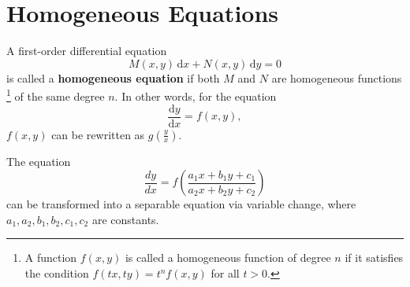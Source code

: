 \documentclass[11pt]{elegantbook}
\begin{document}
\section{Homogeneous Equations}
\begin{definition}\label{def:homogeneous equations}
    A first-order differential equation 
    \begin{equation*}
        M(x, y) \, \mathrm{d}x + N(x, y) \, \mathrm{d}y = 0
    \end{equation*}
    is called a \textbf{homogeneous equation} if both \(M\) and \(N\) are homogeneous functions
    \footnote{
        A function \(f(x, y)\) is called a homogeneous function of degree \(n\) 
        if it satisfies the condition \(f(tx, ty) = t^n f(x, y)\) for all \(t > 0\).
        }
    of the same degree \(n\).    
    In other words, for the equation
    \[
        \frac{\mathrm{d}y}{\mathrm{d}x} = f(x, y), 
    \]
    \(f(x,y)\) can be rewritten as \(g\left(\frac{y}{x}\right)\).
\end{definition}


The equation  
\begin{equation}\label{eq:Second kind separable equation}
    \frac{dy}{dx} = f\left(\frac{a_1x + b_1y + c_1}{a_2x + b_2y + c_2}\right) 
\end{equation}
can be transformed into a separable equation via variable change, 
where \(a_1, a_2, b_1, b_2, c_1, c_2\) are constants. 
\end{document}
